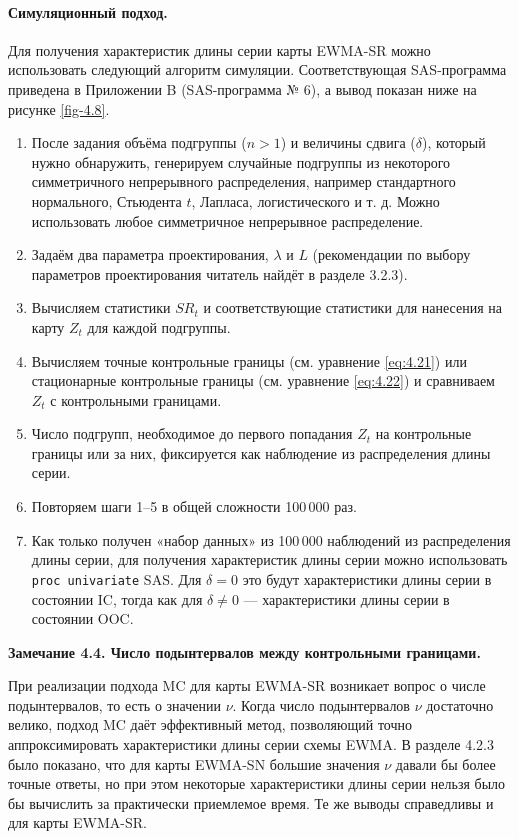 \paragraph{Симуляционный подход.} Для получения характеристик длины серии карты EWMA-SR можно использовать следующий алгоритм симуляции. Соответствующая SAS-программа приведена в Приложении B (SAS-программа № 6), а вывод показан ниже на рисунке \ref{fig-4.8}.

\begin{enumerate}
	\item[\textbf{Шаг 1:}] После задания объёма подгруппы (\(n > 1\)) и величины сдвига (\(\delta\)), который нужно обнаружить, генерируем случайные подгруппы из некоторого симметричного непрерывного распределения, например стандартного нормального, Стьюдента \(t\), Лапласа, логистического и т. д. Можно использовать любое симметричное непрерывное распределение.
	\item[\textbf{Шаг 2:}] Задаём два параметра проектирования, \(\lambda\) и \(L\) (рекомендации по выбору параметров проектирования читатель найдёт в разделе 3.2.3).
	\item[\textbf{Шаг 3:}] Вычисляем статистики \(SR_t\) и соответствующие статистики для нанесения на карту \(Z_t\) для каждой подгруппы.
	\item[\textbf{Шаг 4:}] Вычисляем точные контрольные границы (см. уравнение \eqref{eq:4.21}) или стационарные контрольные границы (см. уравнение \eqref{eq:4.22}) и сравниваем \(Z_t\) с контрольными границами.
	\item[\textbf{Шаг 5:}] Число подгрупп, необходимое до первого попадания \(Z_t\) на контрольные границы или за них, фиксируется как наблюдение из распределения длины серии.
	\item[\textbf{Шаг 6:}] Повторяем шаги 1--5 в общей сложности 100\,000 раз.
	\item[\textbf{Шаг 7:}] Как только получен «набор данных» из 100\,000 наблюдений из распределения длины серии, для получения характеристик длины серии можно использовать \texttt{proc univariate} SAS. Для \(\delta = 0\) это будут характеристики длины серии в состоянии IC, тогда как для \(\delta \ne 0\) --- характеристики длины серии в состоянии OOC.
\end{enumerate}

\noindent\textbf{Замечание 4.4. Число подынтервалов между контрольными границами.}

При реализации подхода MC для карты EWMA-SR возникает вопрос о числе подынтервалов, то есть о значении \(\nu\). Когда число подынтервалов \(\nu\) достаточно велико, подход MC даёт эффективный метод, позволяющий точно аппроксимировать характеристики длины серии схемы EWMA. В разделе 4.2.3 было показано, что для карты EWMA-SN большие значения \(\nu\) давали бы более точные ответы, но при этом некоторые характеристики длины серии нельзя было бы вычислить за практически приемлемое время. Те же выводы справедливы и для карты EWMA-SR.


